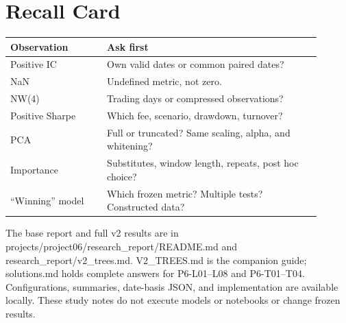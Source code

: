 \clearpage\section{Recall Card}
\begin{center}\small
\begin{tabular}{p{0.28\linewidth}p{0.62\linewidth}}
\toprule
Observation & Ask first\\
\midrule
Positive IC & Own valid dates or common paired dates?\\
NaN & Undefined metric, not zero.\\
NW(4) & Trading days or compressed observations?\\
Positive Sharpe & Which fee, scenario, drawdown, turnover?\\
PCA & Full or truncated? Same scaling, alpha, and whitening?\\
Importance & Substitutes, window length, repeats, post hoc choice?\\
“Winning” model & Which frozen metric? Multiple tests? Constructed data?\\
\bottomrule
\end{tabular}
\end{center}
The base report and full v2 results are in projects/project06/research\_report/README.md and research\_report/v2\_trees.md. V2\_TREES.md is the companion guide; solutions.md holds complete answers for P6-L01–L08 and P6-T01–T04. Configurations, summaries, date-basis JSON, and implementation are available locally. These study notes do not execute models or notebooks or change frozen results.


